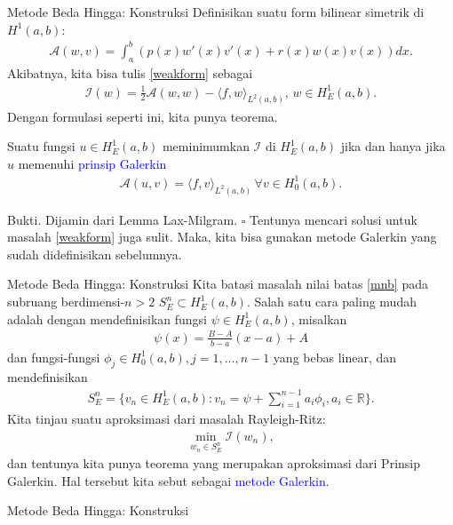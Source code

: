\documentclass[xcolor={dvipsnames}, 9pt]{beamer}
\renewcommand{\emph}[1]{\textcolor{Blue}{#1}}
\begin{document}
    \begin{frame}{Metode Beda Hingga: Konstruksi}
       Definisikan suatu form bilinear simetrik di $H^1(a,b)$:
       \begin{align*}
           \mathcal{A}(w,v) = \int_a^b (p(x)w'(x)v'(x)+r(x)w(x)v(x)) dx.
       \end{align*}
       Akibatnya, kita bisa tulis \eqref{weakform} sebagai
       \begin{align}\label{weakform2}
           \mathcal{I}(w) = \frac{1}{2}\mathcal{A}(w,w) - \langle f,w\rangle_{L^2(a,b)}, \, w\in H^1_E(a,b).
       \end{align}
       Dengan formulasi seperti ini, kita punya teorema.
       \begin{theorem}
           Suatu fungsi $u\in H^1_E(a,b)$ meminimumkan $\mathcal{I}$ di $H^1_E(a,b)$ jika dan hanya jika $u$ memenuhi \emph{prinsip Galerkin}
           \begin{align}\label{galerkin}
               \mathcal{A}(u,v) = \langle f,v\rangle_{L^2(a,b)} \, \forall v\in H^1_0(a,b).
           \end{align}
       \end{theorem}
       Bukti. Dijamin dari Lemma Lax-Milgram. $\square$ \newline
       Tentunya mencari solusi untuk masalah \eqref{weakform} juga sulit. Maka, kita bisa gunakan metode Galerkin yang sudah didefinisikan sebelumnya.
    \end{frame}
    \begin{frame}{Metode Beda Hingga: Konstruksi}
        Kita batasi masalah nilai batas \eqref{mnb} pada subruang berdimensi-$n>2$ $S_E^n\subset H_E^1(a,b)$. Salah satu cara paling mudah adalah dengan mendefinisikan fungsi $\psi\in H_E^1(a,b)$, misalkan
		\begin{align*}
			\psi(x) = \frac{B-A}{b-a}(x-a)+A
		\end{align*}
		dan fungsi-fungsi $\phi_j\in H_0^1(a,b), j = 1,\dots,n-1$ yang bebas linear, dan mendefinisikan
		\begin{align*}
			S_E^n = \{v_n\in H_E^1(a,b) : v_n = \psi + \sum_{i=1}^{n-1}a_i\phi_i, a_i\in\mathbb{R}\}.
		\end{align*}
		Kita tinjau suatu aproksimasi dari masalah Rayleigh-Ritz:
		\begin{align*}
			\min_{w_n \in S_E^n} \mathcal{I}(w_n),
		\end{align*}
		dan tentunya kita punya teorema yang merupakan aproksimasi dari Prinsip Galerkin. Hal tersebut kita sebut sebagai \emph{metode Galerkin}.
    \end{frame}
    \begin{frame}{Metode Beda Hingga: Konstruksi}
    	
    \end{frame}
\end{document}
